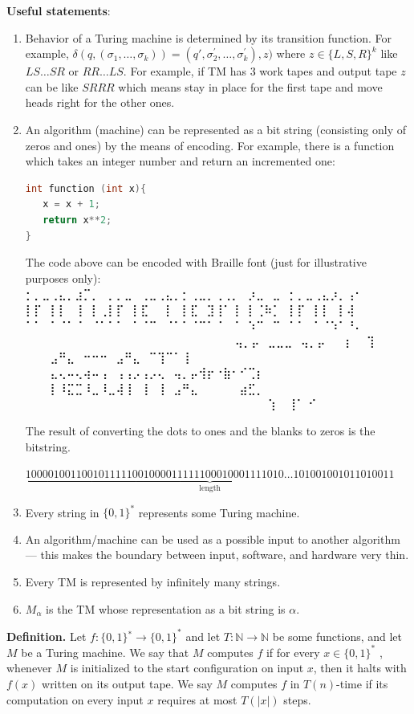 \documentclass[a4paper,12pt]{article}
\begin{document}
\textbf{Useful statements}:
\begin{enumerate}
\item Behavior of a Turing machine is determined by its transition function. For example,
$\delta(q, (\sigma_1, \dots, \sigma_k)) = (q', \sigma^{'}_2, \dots, \sigma^{'}_k), z) $ where $z \in \{L, S, R\}^{k}$ like $LS\dots SR$ or $RR\dots LS$. For example, if TM has 3 work tapes and output tape $z$ can be like $SRRR$ which means stay in place for the first tape and move heads right for the other ones. 
\item  An algorithm (machine) can be represented as a bit string (consisting only of zeros and ones) by the means of encoding. For example, there is a function which takes an integer number and return an incremented one:
\begin{lstlisting}[language=C]
int function (int x){
   x = x + 1; 
   return x**2; 
}
\end{lstlisting}

The code above can be encoded with Braille font  (just for illustrative purposes only):
{\obeylines\braille
⡂⡀⣀⢀⣄⡀⣰⡉⡀⠀⡀⡀⣀⠀⢀⣀⢀⣄⡀⡂⢀⣀⡀⢀⢀⡀⠀⡰⣀⠀⣀⠀⡂⡀⣀⢀⣄⡰⡀⢠⠂
⡇⡏⠀⡇⡇⠀⢸⠀⡇⢀⡇⡏⠀⡇⣏⠀⠀⡇⠀⡇⣏⠀⣹⢸⠁⢸⠀⡇⢈⠷⡁⠀⡇⡏⠀⡇⡇⠀⡇⢼⠀
⠁⠁⠀⠁⠈⠁⠈⠀⠈⠁⠁⠁⠀⠁⠈⠉⠀⠈⠁⠁⠈⠉⠁⠈⠀⠈⠀⠱⠉⠀⠉⠀⠁⠁⠀⠁⠈⠱⠁⠘⠄⠀⠀⠀⠀⠀⠀⠀⠀⠀⠀⠀⠀⠀⠀⠀⠀⠀⠀⠀⠀⠀⠀⠀⠀⠀⠀⠀
⠀⠀⠀⢤⡀⡤⠀⣀⣀⣀⠀⢤⡀⡤⠀⠀⢰⠀⠀⢹⠀
⠀⠀⠀⣠⠛⣄⠀⠒⠒⠒⠀⣠⠛⣄⠀⠉⢹⠉⠁⢸⠀
⠀⠀⠀⣄⢄⠤⢄⢴⠤⢠⠀⢠⢠⡠⢠⡠⢄⠀⢤⡀⡤⢺⡖⠐⣷⠂⠊⢉⡆
⠀⠀⠀⡇⠸⣍⣉⠸⣀⠸⣀⢼⢸⠀⢸⠀⢸⠀⣠⠛⣄⠀⠀⠀⠀⠀⣴⣋⡀
⠀⠀⠀⠀⠀⠀⠀⠀⠀⠀⠀⠀⠀⠀⠀⠀⠀⠀⠀⠀⠀⠀⠀⠀⠀⠀⠀⠀⠀
⢱⠀
⢸⠁
⠊
}

The result of converting the dots to ones and the blanks to zeros is the bitstring. 

$\underbrace{1000010011001011111001000011111100010001111010 \dots 101001001011010011}_\text{length}$

\item Every string in $\{0, 1\}^{*}$ represents some Turing machine.
\item An algorithm/machine can be used as a possible input
to another algorithm — this makes the boundary between input, software, and hardware
very thin. 
\item Every TM is represented by infinitely many strings.
\item $M_\alpha$ is the TM whose representation as a bit string is $\alpha$. 
\end{enumerate}

\textbf{Definition.} 
Let $f : \{0, 1\}^{∗} \rightarrow \{0, 1\}^{*}$ and let $T :  \mathbb{N} →  \mathbb{N}$ be some functions, and let $M$ be a Turing
machine. We say that $M$ computes $f$ if for every $x \in \{0, 1\}^{*}$ , whenever $M$ is initialized
to the start configuration on input $x$, then it halts with $f(x)$ written on its output tape.
We say $M$ computes $f$ in $T(n)$-time if its computation on every input $x$ requires at most $T(|x|)$ steps.
\end{document}
